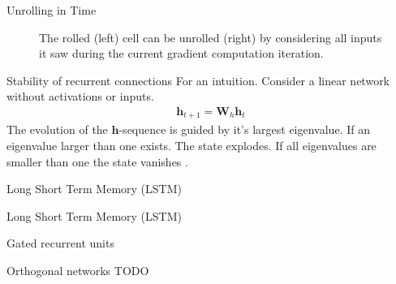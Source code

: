 \documentclass{beamer}
\begin{document}
    \begin{frame}{Unrolling in Time}
      \begin{figure}
        \centering
        
        \caption{The rolled (left) cell can be unrolled (right) by considering all inputs it saw
        during the current gradient computation iteration.}
        \label{fig:unroll_recurrent_cell}
    \end{figure}
    \end{frame}

    \begin{frame}{Stability of recurrent connections}
      For an intuition. Consider a linear network without activations or inputs.
      \begin{align}
        \mathbf{h}_{t+1} = \mathbf{W}_h \mathbf{h}_t
      \end{align}
      The evolution of the $\mathbf{h}$-sequence is guided by it's largest eigenvalue.
      If an eigenvalue larger than one exists. The state explodes.
      If all eigenvalues are smaller than one the state vanishes
      \cite{goodfellow2016deep}.
    \end{frame}

    \begin{frame}{Long Short Term Memory (LSTM)}
      \begin{figure}
        
      \end{figure}
      \cite{greff2016lstm}
    \end{frame}

    \begin{frame}{Long Short Term Memory (LSTM)}
      \begin{figure}
        
      \end{figure}
      \cite{greff2016lstm}
    \end{frame}


    \begin{frame}{Gated recurrent units}
      \begin{figure}
      
      \end{figure}
    \end{frame}

    \begin{frame}{Orthogonal networks}
      TODO
    \end{frame}
\end{document}
